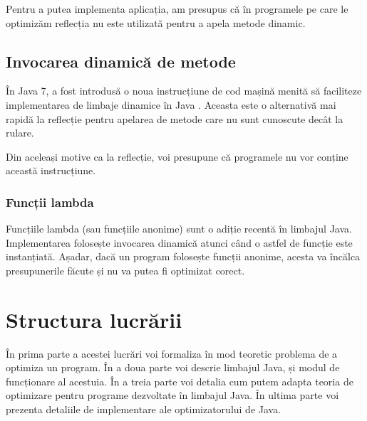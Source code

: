 Pentru a putea implementa aplicația, am presupus că în programele pe care le
optimizăm reflecția nu este utilizată pentru a apela metode dinamic.

\subsection{Invocarea dinamică de metode}

În Java 7, a fost introdusă o noua instrucțiune de cod mașină menită să
faciliteze implementarea de limbaje dinamice în Java \cite{java_invokedynamic}.
Aceasta este o alternativă mai rapidă la reflecție pentru apelarea de metode
care nu sunt cunoscute decât la rulare.

Din aceleași motive ca la reflecție, voi presupune că programele nu vor conține
această instrucțiune.

\subsubsection{Funcții lambda}

Funcțiile lambda (sau funcțiile anonime) sunt o adiție recentă în limbajul Java.
Implementarea folosește invocarea dinamică atunci când o astfel de funcție
este instanțiată.
Așadar, dacă un program folosește funcții anonime, acesta va încălca
presupunerile făcute și nu va putea fi optimizat corect.


\section{Structura lucrării}

În prima parte a acestei lucrări voi formaliza în mod teoretic
problema de a optimiza un program.
În a doua parte voi descrie limbajul Java, și modul de
funcționare al acestuia.
În a treia parte voi detalia cum putem adapta teoria de
optimizare pentru programe dezvoltate în limbajul Java.
În ultima parte voi prezenta detaliile de implementare ale
optimizatorului de Java.
